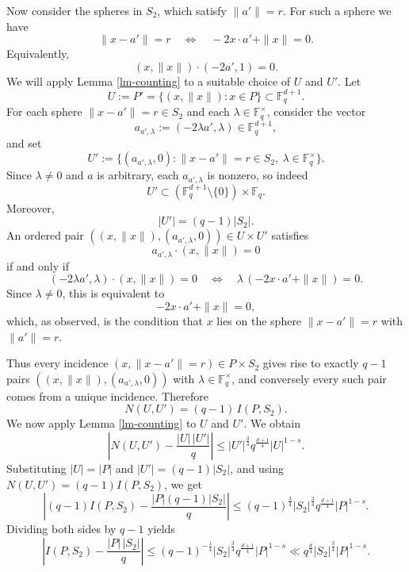 \documentclass{article}
\begin{document}


Now consider the spheres in $S_2$, which satisfy $\|a'\| = r$. For such a sphere we have
\[
\|x -a'\| = r \quad\Longleftrightarrow\quad -2 x \cdot a' + \|x\| = 0.
\]
Equivalently,
\[
(x,\|x\|) \cdot (-2a',1) = 0.
\]
We will apply Lemma \ref{lm-counting} to a suitable choice of $U$ and $U'$. Let
\[
U := P' = \{(x,\|x\|) : x \in P\} \subset \mathbb{F}_q^{d+1}.
\]
For each sphere $\|x-a'\| = r \in S_2$ and each $\lambda \in \mathbb{F}_q^\times$, consider the vector
\[
{a}_{a',\lambda} := (-2\lambda a',\lambda) \in \mathbb{F}_q^{d+1},
\]
and set
\[
U' := \{ ({a}_{a',\lambda},0) : \|x-a'\| = r \in S_2,\ \lambda \in \mathbb{F}_q^\times\}.
\]
Since $\lambda \neq 0$ and $a$ is arbitrary, each ${a}_{a',\lambda}$ is nonzero, so indeed
\[
U' \subset (\mathbb{F}_q^{d+1} \setminus \{0\}) \times \mathbb{F}_q.
\]
Moreover,
\[
|U'| = (q-1)|S_2|.
\]
An ordered pair $((x,\|x\|),({a}_{a',\lambda},0)) \in U \times U'$ satisfies
\[
{a}_{a',\lambda} \cdot (x,\|x\|) = 0
\]
if and only if
\[
(-2\lambda a',\lambda) \cdot (x,\|x\|) = 0
\quad\Longleftrightarrow\quad
\lambda\,(-2 x \cdot a' + \|x\|) = 0.
\]
Since $\lambda \neq 0$, this is equivalent to
\[
-2 x \cdot a' + \|x\| = 0,
\]
which, as observed, is the condition that $x$ lies on the sphere $\|x-a'\| = r$ with $\|a'\| = r$.

Thus every incidence $(x,\|x-a'\| = r) \in P \times S_2$ gives rise to exactly $q-1$ pairs $((x,\|x\|),({a}_{a',\lambda},0))$ with $\lambda \in \mathbb{F}_q^\times$, and conversely every such pair comes from a unique incidence. Therefore
\[
N(U,U') = (q-1)\, I(P,S_2).
\]
We now apply Lemma \ref{lm-counting} to $U$ and $U'$. We obtain
\[
\left| N(U,U') - \frac{|U| \, |U'|}{q} \right|
\le |U'|^{\frac{3}{4}} q^{\frac{d+1}{4}} |U|^{1-s}.
\]
Substituting $|U| = |P|$ and $|U'| = (q-1)|S_2|$, and using $N(U,U') = (q-1) I(P,S_2)$, we get
\[
\left| (q-1) I(P,S_2) - \frac{|P|(q-1)|S_2|}{q} \right|
\le (q-1)^{\frac{3}{4}} |S_2|^{\frac{3}{4}} q^{\frac{d+1}{4}} |P|^{1-s}.
\]
Dividing both sides by $q-1$ yields
\[
\left| I(P,S_2) - \frac{|P| \, |S_2|}{q} \right|
\le (q-1)^{-\frac{1}{4}} |S_2|^{\frac{3}{4}} q^{\frac{d+1}{4}} |P|^{1-s} \ll q^{\frac{d}{4}} |S_2|^{\frac{3}{4}} |P|^{1-s}.
\]
\end{document}
